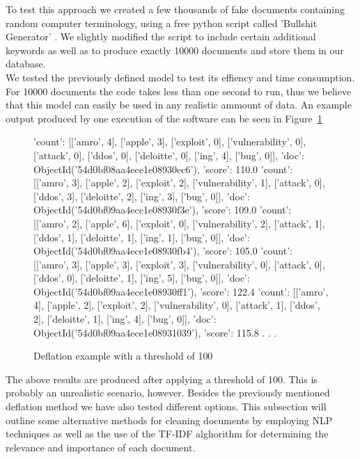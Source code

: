 \documentclass[12pt]{article}
\newcounter{subsubsubsection}[subsubsection]
\begin{document}
To test this approach we created a few thousands of fake documents containing random computer terminology, using a free python script called 'Bullshit Generator' \cite{bullgen}. We slightly modified the script to include certain additional keywords as well as to produce exactly 10000 documents and store them in our database. 
\hfill \break\\
We tested the previously defined model to test its effiency and time consumption. For 10000 documents the code takes less than one second to run, thus we believe that this model can easily be used in any realistic ammount of data. An example output produced by one execution of the software can be seen in Figure~\ref{fig:deflate}

\begin{figure}[t]
\begin{footnotesize}
\begin{spverbatim}

{'count': [['amro', 4], ['apple', 3], ['exploit', 0], ['vulnerability', 0], ['attack', 0], ['ddos', 0], ['deloitte', 0], ['ing', 4], ['bug', 0]], 'doc': ObjectId('54d0bf08aa4ece1e08930ec6'), 'score': 110.0}
{'count': [['amro', 3], ['apple', 2], ['exploit', 2], ['vulnerability', 1], ['attack', 0], ['ddos', 3], ['deloitte', 2], ['ing', 3], ['bug', 0]], 'doc': ObjectId('54d0bf09aa4ece1e08930f3e'), 'score': 109.0}
{'count': [['amro', 2], ['apple', 6], ['exploit', 0], ['vulnerability', 2], ['attack', 1], ['ddos', 1], ['deloitte', 1], ['ing', 1], ['bug', 0]], 'doc': ObjectId('54d0bf09aa4ece1e08930fb4'), 'score': 105.0}
{'count': [['amro', 3], ['apple', 3], ['exploit', 3], ['vulnerability', 0], ['attack', 0], ['ddos', 0], ['deloitte', 1], ['ing', 5], ['bug', 0]], 'doc': ObjectId('54d0bf09aa4ece1e08930ff1'), 'score': 122.4}
{'count': [['amro', 4], ['apple', 2], ['exploit', 2], ['vulnerability', 0], ['attack', 1], ['ddos', 2], ['deloitte', 1], ['ing', 4], ['bug', 0]], 'doc': ObjectId('54d0bf09aa4ece1e08931039'), 'score': 115.8}
.
.
.
\end{spverbatim}
\end{footnotesize}
\captionsetup{font=small}
\caption{Deflation example with a threshold of 100}
\label{fig:deflate}
\end{figure}
\newpage 
\hfill \break
The above results are produced after applying a threshold of 100. This is probably an unrealistic scenario, however.
Besides the previously mentioned deflation method we have also tested different options. This subsection will outline some alternative methods for cleaning documents by employing NLP techniques as well as the use of the TF-IDF alghorithm for determining the relevance and importance of each document.
\newpage
\end{document}
